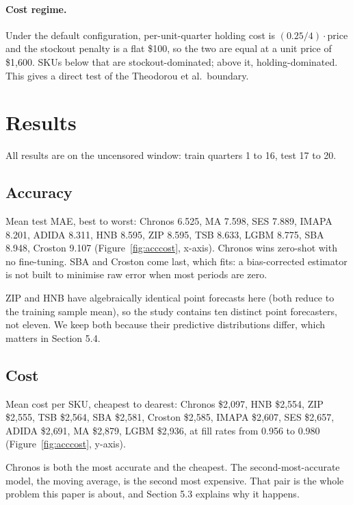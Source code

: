 \documentclass[11pt]{article}
\begin{document}
\paragraph{Cost regime.} Under the default configuration, per-unit-quarter
holding cost is $(0.25/4)\cdot\text{price}$ and the stockout penalty is a flat
\$100, so the two are equal at a unit price of \$1{,}600. SKUs below that are
stockout-dominated; above it, holding-dominated. This gives a direct test of
the Theodorou et al.\ boundary.

\section{Results}

All results are on the uncensored window: train quarters 1 to 16, test 17 to 20.

\subsection{Accuracy}

Mean test MAE, best to worst: Chronos 6.525, MA 7.598, SES 7.889, IMAPA 8.201,
ADIDA 8.311, HNB 8.595, ZIP 8.595, TSB 8.633, LGBM 8.775, SBA 8.948, Croston
9.107 (Figure~\ref{fig:acccost}, x-axis). Chronos wins zero-shot with no
fine-tuning. SBA and Croston come last, which fits: a bias-corrected estimator
is not built to minimise raw error when most periods are zero.

ZIP and HNB have algebraically identical point forecasts here (both reduce to
the training sample mean), so the study contains ten distinct point
forecasters, not eleven. We keep both because their predictive distributions
differ, which matters in Section 5.4.

\subsection{Cost}

Mean cost per SKU, cheapest to dearest: Chronos \$2{,}097, HNB \$2{,}554, ZIP
\$2{,}555, TSB \$2{,}564, SBA \$2{,}581, Croston \$2{,}585, IMAPA \$2{,}607,
SES \$2{,}657, ADIDA \$2{,}691, MA \$2{,}879, LGBM \$2{,}936, at fill rates
from 0.956 to 0.980 (Figure~\ref{fig:acccost}, y-axis).

Chronos is both the most accurate and the cheapest. The second-most-accurate
model, the moving average, is the second most expensive. That pair is the whole
problem this paper is about, and Section 5.3 explains why it happens.
\end{document}
